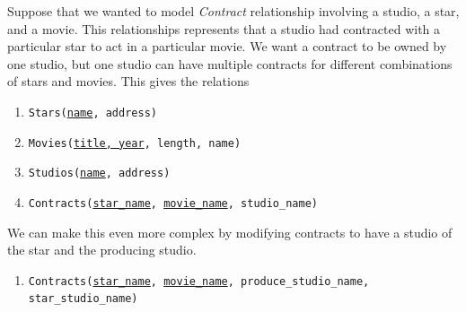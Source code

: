     \begin{example}
      Suppose that we wanted to model \textit{Contract} relationship involving a studio, a star, and a movie. This relationships represents that a studio had contracted with a particular star to act in a particular movie. We want a contract to be owned by one studio, but one studio can have multiple contracts for different combinations of stars and movies. This gives the relations 
      \begin{enumerate}
        \item \texttt{Stars(\underline{name}, address)} 
        \item \texttt{Movies(\underline{title, year}, length, name)} 
        \item \texttt{Studios(\underline{name}, address)} 
        \item \texttt{Contracts(\underline{star\_name}, \underline{movie\_name}, studio\_name)}
      \end{enumerate}

      \begin{figure}[H]
        \centering 
        \caption{} 
        \label{fig:movie-contracts-simple}
      \end{figure}

      We can make this even more complex by modifying contracts to have a studio of the star and the producing studio. 
      \begin{enumerate}
        \item \texttt{Contracts(\underline{star\_name}, \underline{movie\_name}, produce\_studio\_name, star\_studio\_name)}
      \end{enumerate}


\end{example}

